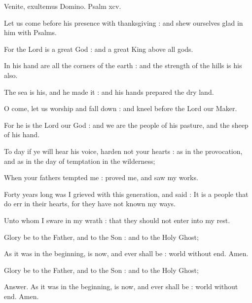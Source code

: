 Venite, exultemus Domino.
Psalm xcv.


Let us come before his presence with thanksgiving : and shew ourselves glad in him with Psalms.

For the Lord is a great God : and a great King above all gods.

In his hand are all the corners of the earth : and the strength of the hills is his also.

The sea is his, and he made it : and his hands prepared the dry land.

O come, let us worship and fall down : and kneel before the Lord our Maker.

For he is the Lord our God : and we are the people of his pasture, and the sheep of his hand.

To day if ye will hear his voice, harden not your hearts : as in the provocation, and as in the day of temptation in the wilderness;

When your fathers tempted me : proved me, and saw my works.

Forty years long was I grieved with this generation, and said : It is a people that do err in their hearts, for they have not known my ways.

Unto whom I sware in my wrath : that they should not enter into my rest.

Glory be to the Father, and to the Son : and to the Holy Ghost;

As it was in the beginning, is now, and ever shall be : world without end. Amen.

Glory be to the Father, and to the Son : and to the Holy Ghost;

Answer. As it was in the beginning, is now, and ever shall be : world without end. Amen.


